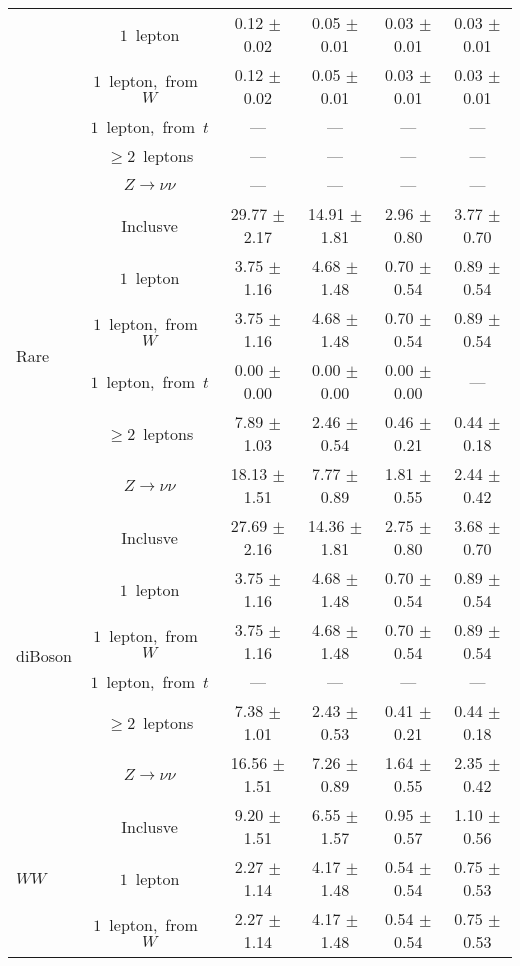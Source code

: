 \documentclass{article}
\begin{document}
\begin{longtable}{|l|c|c|c|c|c|}
 & $1$~lepton  & 0.12 $\pm$ 0.02  & 0.05 $\pm$ 0.01  & 0.03 $\pm$ 0.01  & 0.03 $\pm$ 0.01 \\* 
 & $1$~lepton,~from~$W$  & 0.12 $\pm$ 0.02  & 0.05 $\pm$ 0.01  & 0.03 $\pm$ 0.01  & 0.03 $\pm$ 0.01 \\* 
 & $1$~lepton,~from~$t$  & ---  & ---  & ---  & --- \\* 
 & $\ge2$~leptons  & ---  & ---  & ---  & --- \\* 
 & $Z\rightarrow\nu\nu$  & ---  & ---  & ---  & --- \\* 
\hline 
\multirow{6}{*}{Rare} & Inclusve  & 29.77 $\pm$ 2.17  & 14.91 $\pm$ 1.81  & 2.96 $\pm$ 0.80  & 3.77 $\pm$ 0.70 \\* 
 & $1$~lepton  & 3.75 $\pm$ 1.16  & 4.68 $\pm$ 1.48  & 0.70 $\pm$ 0.54  & 0.89 $\pm$ 0.54 \\* 
 & $1$~lepton,~from~$W$  & 3.75 $\pm$ 1.16  & 4.68 $\pm$ 1.48  & 0.70 $\pm$ 0.54  & 0.89 $\pm$ 0.54 \\* 
 & $1$~lepton,~from~$t$  & 0.00 $\pm$ 0.00  & 0.00 $\pm$ 0.00  & 0.00 $\pm$ 0.00  & --- \\* 
 & $\ge2$~leptons  & 7.89 $\pm$ 1.03  & 2.46 $\pm$ 0.54  & 0.46 $\pm$ 0.21  & 0.44 $\pm$ 0.18 \\* 
 & $Z\rightarrow\nu\nu$  & 18.13 $\pm$ 1.51  & 7.77 $\pm$ 0.89  & 1.81 $\pm$ 0.55  & 2.44 $\pm$ 0.42 \\* 
\hline 
\multirow{6}{*}{diBoson} & Inclusve  & 27.69 $\pm$ 2.16  & 14.36 $\pm$ 1.81  & 2.75 $\pm$ 0.80  & 3.68 $\pm$ 0.70 \\* 
 & $1$~lepton  & 3.75 $\pm$ 1.16  & 4.68 $\pm$ 1.48  & 0.70 $\pm$ 0.54  & 0.89 $\pm$ 0.54 \\* 
 & $1$~lepton,~from~$W$  & 3.75 $\pm$ 1.16  & 4.68 $\pm$ 1.48  & 0.70 $\pm$ 0.54  & 0.89 $\pm$ 0.54 \\* 
 & $1$~lepton,~from~$t$  & ---  & ---  & ---  & --- \\* 
 & $\ge2$~leptons  & 7.38 $\pm$ 1.01  & 2.43 $\pm$ 0.53  & 0.41 $\pm$ 0.21  & 0.44 $\pm$ 0.18 \\* 
 & $Z\rightarrow\nu\nu$  & 16.56 $\pm$ 1.51  & 7.26 $\pm$ 0.89  & 1.64 $\pm$ 0.55  & 2.35 $\pm$ 0.42 \\* 
\hline 
\multirow{6}{*}{$WW$} & Inclusve  & 9.20 $\pm$ 1.51  & 6.55 $\pm$ 1.57  & 0.95 $\pm$ 0.57  & 1.10 $\pm$ 0.56 \\* 
 & $1$~lepton  & 2.27 $\pm$ 1.14  & 4.17 $\pm$ 1.48  & 0.54 $\pm$ 0.54  & 0.75 $\pm$ 0.53 \\* 
 & $1$~lepton,~from~$W$  & 2.27 $\pm$ 1.14  & 4.17 $\pm$ 1.48  & 0.54 $\pm$ 0.54  & 0.75 $\pm$ 0.53 \\* 

\end{longtable}
\end{document}
